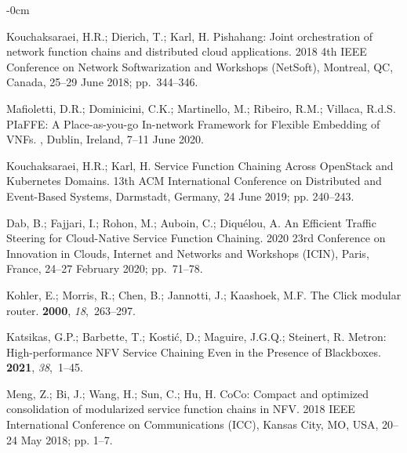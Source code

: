 \documentclass[futureinternet,review,accept,pdftex,moreauthors]{Definitions/mdpi}
\begin{document}
\begin{adjustwidth}{-\extralength}{0cm}
\begin{thebibliography}{999}
Kouchaksaraei, H.R.; Dierich, T.; Karl, H.
\newblock Pishahang: Joint orchestration of network function chains and
  distributed cloud applications.
 2018 4th IEEE Conference on Network Softwarization and Workshops
  (NetSoft),   Montreal, QC, Canada, 25--29 June 2018; \mbox{pp. 344--346.}

Mafioletti, D.R.; Dominicini, C.K.; Martinello, M.; Ribeiro, R.M.; Villaca,
  R.d.S.
\newblock PIaFFE: A Place-as-you-go In-network Framework for Flexible Embedding
  of VNFs.
,  Dublin, Ireland,  7--11 June {2020}.

Kouchaksaraei, H.R.; Karl, H.
\newblock Service Function Chaining Across OpenStack and Kubernetes Domains.
 13th ACM International Conference on Distributed
  and Event-Based Systems,  Darmstadt, Germany, 24 June 2019; pp. 240--243.

Dab, B.; Fajjari, I.; Rohon, M.; Auboin, C.; Diqu{\'e}lou, A.
\newblock An Efficient Traffic Steering for Cloud-Native Service Function
  Chaining.
 2020 23rd Conference on Innovation in Clouds, Internet and Networks
  and Workshops (ICIN),  Paris, France, 24--27 February 2020; \mbox{pp. 71--78.}

Kohler, E.; Morris, R.; Chen, B.; Jannotti, J.; Kaashoek, M.F.
\newblock The Click modular router.
 {\bf 2000}, {\em
  18},~263--297.

Katsikas, G.P.; Barbette, T.; Kosti{\'c}, D.; Maguire, J.G.Q.; Steinert, R.
\newblock Metron: High-performance NFV Service Chaining Even in the Presence of
  Blackboxes.
 {\bf 2021}, {\em
  38},~1--45.

Meng, Z.; Bi, J.; Wang, H.; Sun, C.; Hu, H.
\newblock CoCo: Compact and optimized consolidation of modularized service
  function chains in NFV.
 2018 IEEE International Conference on Communications (ICC),  Kansas City, MO, USA,  20--24 May 2018; pp. 1--7.


\end{thebibliography}
\end{adjustwidth}
\end{document}
